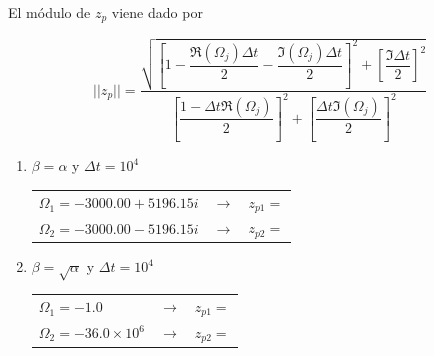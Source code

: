 El módulo de $z_p$ viene dado por

\begin{equation}
||z_p|| = \dfrac{ \sqrt{ \left[ 1 - \dfrac{\Re(\Omega_j)\Delta t}{2} - \dfrac{\Im(\Omega_j)\Delta t}{2} \right]^2 + \left[ \dfrac{\Im \Delta t}{2}\right]^2 } } {\left[ \dfrac{1-\Delta t \Re(\Omega_j)}{2} \right]^2 + \left[ \dfrac{\Delta t \Im(\Omega_j)}{2} \right]^2}
\end{equation}

\begin{enumerate}[label=(\alph*)]

\item $\beta = \alpha$ y $\Delta t = 10^4$
\begin{center}
\begin{tabular}{lll}
$\Omega_1 = −3000.00 + 5196.15i$ & $\rightarrow$ & $z_{p1} = $ \\
$\Omega_2 = −3000.00 - 5196.15i$ & $\rightarrow$ & $z_{p2} = $
\end{tabular}
\end{center}

\item $\beta = \sqrt{\alpha}$ y $\Delta t = 10^4$
\begin{center}
\begin{tabular}{lll}
$\Omega_1 = -1.0$ & $\rightarrow$ & $z_{p1} = $ \\
$\Omega_2 = -36.0 \times 10^6$ & $\rightarrow$ & $z_{p2} = $
\end{tabular}
\end{center}

\end{enumerate}


